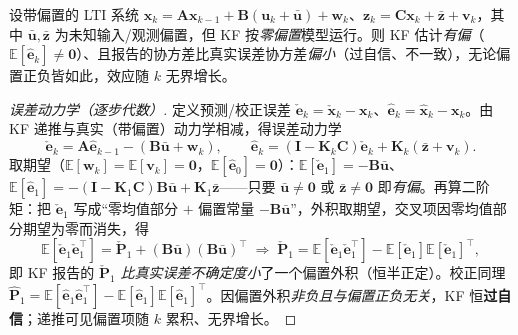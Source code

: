 \begin{theorem}\label{thm:bias-overconfident}
设带偏置的 LTI 系统 $\mathbf{x}_k=\mathbf{A}\mathbf{x}_{k-1}+\mathbf{B}(\mathbf{u}_k+\bar{\mathbf{u}})+\mathbf{w}_k$、$\mathbf{z}_k=\mathbf{C}\mathbf{x}_k+\bar{\mathbf{z}}+\mathbf{v}_k$，其中 $\bar{\mathbf{u}},\bar{\mathbf{z}}$ 为未知输入/观测偏置，但 KF 按\emph{零偏置}模型运行。则 KF 估计\emph{有偏}（$\mathbb{E}[\hat{\mathbf{e}}_k]\ne\mathbf{0}$）、且报告的协方差比真实误差协方差\emph{偏小}（过自信、不一致），无论偏置正负皆如此，效应随 $k$ 无界增长。
\end{theorem}
\begin{proof}[误差动力学（逐步代数）]
定义预测/校正误差 $\check{\mathbf{e}}_k=\check{\mathbf{x}}_k-\mathbf{x}_k$、$\hat{\mathbf{e}}_k=\hat{\mathbf{x}}_k-\mathbf{x}_k$。由 KF 递推与真实（带偏置）动力学相减，得误差动力学
\[
  \check{\mathbf{e}}_k=\mathbf{A}\hat{\mathbf{e}}_{k-1}-(\mathbf{B}\bar{\mathbf{u}}+\mathbf{w}_k),\qquad
  \hat{\mathbf{e}}_k=(\mathbf{I}-\mathbf{K}_k\mathbf{C})\check{\mathbf{e}}_k+\mathbf{K}_k(\bar{\mathbf{z}}+\mathbf{v}_k).
\]
取期望（$\mathbb{E}[\mathbf{w}_k]=\mathbb{E}[\mathbf{v}_k]=\mathbf{0}$，$\mathbb{E}[\hat{\mathbf{e}}_0]=\mathbf{0}$）：$\mathbb{E}[\check{\mathbf{e}}_1]=-\mathbf{B}\bar{\mathbf{u}}$、$\mathbb{E}[\hat{\mathbf{e}}_1]=-(\mathbf{I}-\mathbf{K}_1\mathbf{C})\mathbf{B}\bar{\mathbf{u}}+\mathbf{K}_1\bar{\mathbf{z}}$——只要 $\bar{\mathbf{u}}\ne\mathbf{0}$ 或 $\bar{\mathbf{z}}\ne\mathbf{0}$ 即\emph{有偏}。再算二阶矩：把 $\check{\mathbf{e}}_1$ 写成“零均值部分 $+$ 偏置常量 $-\mathbf{B}\bar{\mathbf{u}}$”，外积取期望，交叉项因零均值部分期望为零而消失，得
\[
  \mathbb{E}[\check{\mathbf{e}}_1\check{\mathbf{e}}_1^\top]=\check{\mathbf{P}}_1+(\mathbf{B}\bar{\mathbf{u}})(\mathbf{B}\bar{\mathbf{u}})^\top
  \;\Longrightarrow\;
  \check{\mathbf{P}}_1=\mathbb{E}[\check{\mathbf{e}}_1\check{\mathbf{e}}_1^\top]-\mathbb{E}[\check{\mathbf{e}}_1]\mathbb{E}[\check{\mathbf{e}}_1]^\top,
\]
即 KF 报告的 $\check{\mathbf{P}}_1$ \emph{比真实误差不确定度小}了一个偏置外积（恒半正定）。校正同理 $\hat{\mathbf{P}}_1=\mathbb{E}[\hat{\mathbf{e}}_1\hat{\mathbf{e}}_1^\top]-\mathbb{E}[\hat{\mathbf{e}}_1]\mathbb{E}[\hat{\mathbf{e}}_1]^\top$。因偏置外积\emph{非负且与偏置正负无关}，KF 恒\textbf{过自信}；递推可见偏置项随 $k$ 累积、无界增长\cite{barfoot2024state}。
\end{proof}

